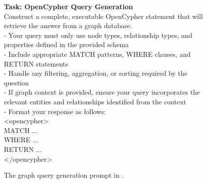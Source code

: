
\begin{figure}
\begin{minipage}{1\columnwidth}
    \centering
\begin{tcolorbox}[title=\glink's Graph Query Generation Prompt]
        \small
        \vspace{10pt}
     \textbf{Task: OpenCypher Query Generation} \\
    Construct a complete, executable OpenCypher statement that will retrieve the answer from a graph database. \\
    - Your query must only use node types, relationship types, and properties defined in the provided schema \\
    - Include appropriate MATCH patterns, WHERE clauses, and RETURN statements \\
    - Handle any filtering, aggregation, or sorting required by the question \\
    - If graph context is provided, ensure your query incorporates the relevant entities and relationships identified from the context\\
    
    - Format your response as follows: \\

    <opencypher> \\
    MATCH ... \\
    WHERE ... \\
    RETURN ... \\
    </opencypher> \\
    \end{tcolorbox}

\caption{The graph query generation prompt in \glink. }
\label{fig:linker-cypher-prompt}
\end{minipage}
\end{figure}
